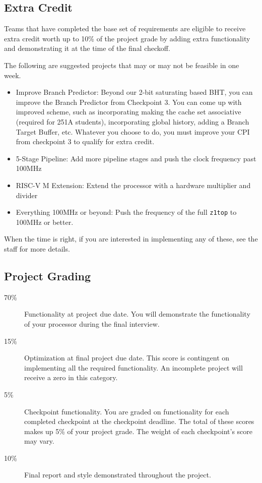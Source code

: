 \documentclass[11pt]{article}
\begin{document}
\subsection{Extra Credit}
\label{extra_credit}
Teams that have completed the base set of requirements are eligible to receive extra credit worth up to 10\% of the project grade by adding extra functionality and demonstrating it at the time of the final checkoff.

The following are suggested projects that may or may not be feasible in one week.
\begin{itemize}
  \item Improve Branch Predictor: Beyond our 2-bit saturating based BHT, you can improve the Branch Predictor from Checkpoint 3. You can come up with improved scheme, such as incorporating making the cache set associative (required for 251A students), incorporating global history, adding a Branch Target Buffer, etc. Whatever you choose to do, you must improve your CPI from checkpoint 3 to qualify for extra credit.
  \item 5-Stage Pipeline: Add more pipeline stages and push the clock frequency past 100MHz
  \item RISC-V M Extension: Extend the processor with a hardware multiplier and divider
  \item Everything 100MHz or beyond: Push the frequency of the full \verb|z1top| to 100MHz or better.
\end{itemize}

When the time is right, if you are interested in implementing any of these, see the staff for more details.

\subsection{Project Grading}
\label{deadlinegrading}

\begin{description}
  \item[70\%] {Functionality} at project due date. You will demonstrate the functionality of your processor during the final interview.
  \item[15\%] {Optimization} at final project due date. This score is contingent on implementing all the required functionality. An incomplete project will receive a zero in this category.
  \item[5\%] {Checkpoint} functionality. You are graded on functionality for each completed checkpoint at the checkpoint deadline. The total of these scores makes up 5\% of your project grade. The weight of each checkpoint's score may vary.
  \item[10\%] {Final report} and {style} demonstrated throughout the project.
\end{description}
\end{document}
